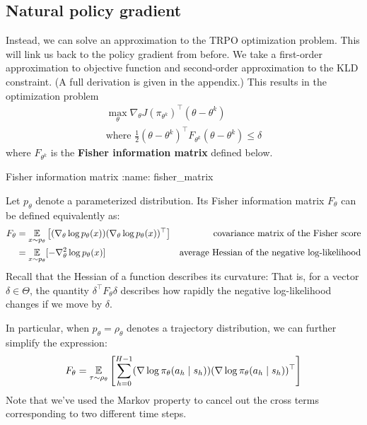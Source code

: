 \documentclass[\main/main]{subfiles}
\begin{document}
\subsection{Natural policy gradient}

Instead, we can solve an approximation to the TRPO optimization problem. This will link us back to the policy gradient from before. We take a first-order approximation to objective function and second-order approximation to the KLD constraint. (A full derivation is given in the appendix.)  This results in the optimization problem
\begin{equation}
    \begin{gathered}
        \max_\theta \nabla_\theta J(\pi_{\theta^k})^\top (\theta - \theta^k) \\
        \text{where } \frac{1}{2} (\theta - \theta^k)^\top F_{\theta^k} (\theta - \theta^k) \le \delta
    \end{gathered}
    \label{npg_optimization}
\end{equation}
where $F_{\theta^k}$ is the \textbf{Fisher information matrix} defined below.
\begin{definition}{Fisher information matrix}
:name: fisher_matrix

    Let $p_\theta$ denote a parameterized distribution. Its Fisher information matrix $F_\theta$ can be defined equivalently as:
    \begin{align*}
        F_{\theta} & = \operatorname*{\mathbb{E}}_{x \sim p_\theta} \left[ (\nabla_\theta \log p_\theta(x)) (\nabla_\theta \log p_\theta(x))^\top \right] & \text{covariance matrix of the Fisher score}          \\
                   & = \operatorname*{\mathbb{E}}_{x \sim p_{\theta}} [- \nabla_\theta^2 \log p_\theta(x)]                                                & \text{average Hessian of the negative log-likelihood}
    \end{align*}
    Recall that the Hessian of a function describes its curvature: That is, for a vector $\delta \in \Theta$, the quantity $\delta^\top F_\theta \delta$ describes how rapidly the negative log-likelihood changes if we move by $\delta$.

    In particular, when $p_\theta = \rho_{\theta}$ denotes a trajectory distribution, we can further simplify the expression:
    \begin{equation}
        F_{\theta} = \operatorname*{\mathbb{E}}_{\tau \sim \rho_\theta} \left[ \sum_{h=0}^{H-1} (\nabla \log \pi_\theta (a_h \mid s_h)) (\nabla \log \pi_\theta(a_h \mid s_h))^\top \right]
        \label{eq:fisher_trajectory}
    \end{equation}
    Note that we've used the Markov property to cancel out the cross terms corresponding to two different time steps.
\end{definition}
\end{document}
